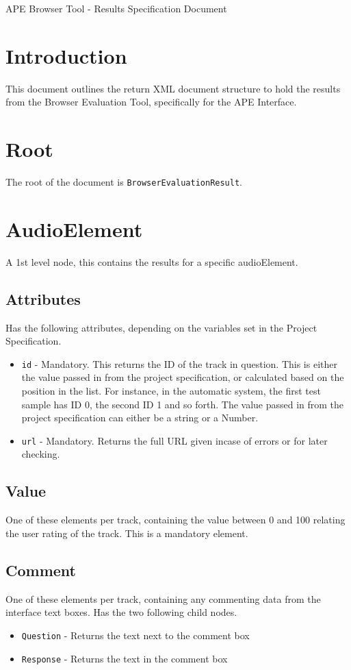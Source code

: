 \documentclass{article}
\begin{document}
\large APE Browser Tool - Results Specification Document

\section{Introduction}
This document outlines the return XML document structure to hold the results from the Browser Evaluation Tool, specifically for the APE Interface.

\section{Root}
The root of the document is \texttt{BrowserEvaluationResult}.

\section{AudioElement}
A 1st level node, this contains the results for a specific audioElement.

\subsection{Attributes}
Has the following attributes, depending on the variables set in the Project Specification.
\begin{itemize}
\item \texttt{id} - Mandatory. This returns the ID of the track in question. This is either the value passed in from the project specification, or calculated based on the position in the list. For instance, in the automatic system, the first test sample has ID 0, the second ID 1 and so forth. The value passed in from the project specification can either be a string or a Number.
\item \texttt{url} - Mandatory. Returns the full URL given incase of errors or for later checking.
\end{itemize}

\subsection{Value}
One of these elements per track, containing the value between 0 and 100 relating the user rating of the track. This is a mandatory element.

\subsection{Comment}
One of these elements per track, containing any commenting data from the interface text boxes. Has the two following child nodes.
\begin{itemize}
\item \texttt{Question} - Returns the text next to the comment box
\item \texttt{Response} - Returns the text in the comment box
\end{itemize}
\end{document}
